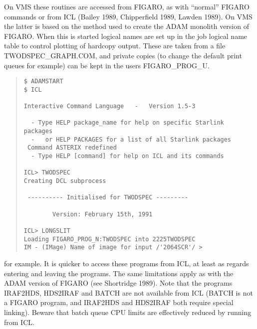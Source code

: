 On VMS these routines are accessed from FIGARO, as with ``normal'' FIGARO
commands or from ICL (Bailey 1989, Chipperfield 1989, Lawden 1989).
On VMS the latter is based on the method used to create the ADAM monolith
version of FIGARO.
When this is started logical names are set up in the job logical name
table to control plotting of hardcopy output.
These are taken from a file TWODSPEC\_GRAPH.COM, and private copies (to
change the default print queues for example) can be kept in the users
FIGARO\_PROG\_U.
\begin{quote}\begin{verbatim}
$ ADAMSTART
$ ICL

Interactive Command Language   -   Version 1.5-3

  - Type HELP package_name for help on specific Starlink packages
  -   or HELP PACKAGES for a list of all Starlink packages
 Command ASTERIX redefined
  - Type HELP [command] for help on ICL and its commands

ICL> TWODSPEC
Creating DCL subprocess

 ---------- Initialised for TWODSPEC ---------

        Version: February 15th, 1991

ICL> LONGSLIT
Loading FIGARO_PROG_N:TWODSPEC into 2225TWODSPEC
IM - (IMage) Name of image for input /'2064SCR'/ >
\end{verbatim}\end{quote}
for example.
It is quicker to access these programs from ICL, at least as regards
entering and leaving the programs.
The same limitations apply as with the ADAM version of FIGARO (see
Shortridge 1989).
Note that the programs IRAF2HDS, HDS2IRAF and BATCH are not available
from ICL (BATCH is not a FIGARO program, and IRAF2HDS and HDS2IRAF both
require special linking).
Beware that batch queue CPU limits are effectively reduced by running
from ICL.

